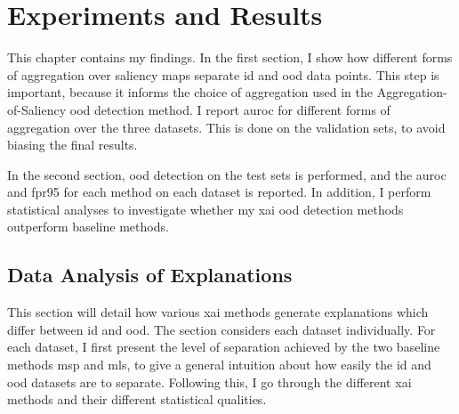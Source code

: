 \documentclass[UKenglish]{uiomasterthesis} %
\theoremstyle{definition}
\begin{document}
%
%
%
%



\chapter{Experiments and Results} \label{chapter:experiments}

This chapter contains my findings. In the first section, I show how different forms of aggregation over saliency maps separate \ac{id} and \ac{ood} data points. This step is important, because it informs the choice of aggregation used in the Aggregation-of-Saliency \ac{ood} detection method. I report \ac{auroc} for different forms of aggregation over the three datasets. This is done on the validation sets, to avoid biasing the final results.

In the second section, \ac{ood} detection on the test sets is performed, and the \ac{auroc} and \ac{fpr95} for each method on each dataset is reported. In addition, I perform statistical analyses to investigate whether my \ac{xai} \ac{ood} detection methods outperform baseline methods.

\section{Data Analysis of Explanations}

This section will detail how various \ac{xai} methods generate explanations which differ between \ac{id} and \ac{ood}. The section considers each dataset individually. For each dataset, I first present the level of separation achieved by the two baseline methods \ac{msp} and \ac{mls}, to give a general intuition about how easily the \ac{id} and \ac{ood} datasets are to separate. Following this, I go through the different \ac{xai} methods and their different statistical qualities.
\end{document}
